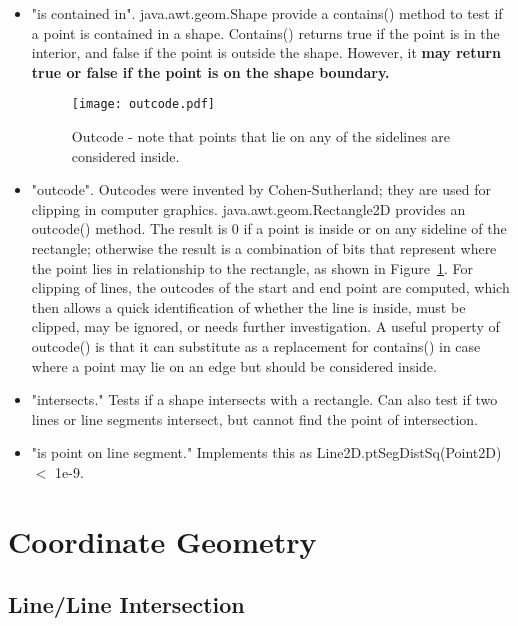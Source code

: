 \begin{itemize}
\item "is contained in".  java.awt.geom.Shape provide a contains() method to test if a point
    is contained in a shape.  Contains() returns true if the point is in the interior, and false
    if the point is outside the shape. However, it \textbf{may return true or false if the point is 
    on the shape boundary.} 

\begin{figure}
    \centering
    \texttt{[image: outcode.pdf]}
    \caption{Outcode - note that points that lie on any of the sidelines are considered inside.}
    \label{fig:outcode}
\end{figure}

\item "outcode". Outcodes were invented by Cohen-Sutherland; they are used for clipping
    in computer graphics.  java.awt.geom.Rectangle2D provides an outcode() method.
    The result is 0 if a point is inside or on any sideline of the rectangle; otherwise 
    the result is a
    combination of bits that represent where the point lies in relationship to the
    rectangle, as shown in Figure~\ref{fig:outcode}.
    For clipping of lines, the outcodes of the start and end point are
    computed, which then allows a quick identification of whether the line is inside,
    must be clipped, may be ignored, or needs further investigation.
    A useful property of outcode() is that it can substitute as a replacement for
    contains() in case where a point may lie on an edge but should be considered
    inside. 

\item "intersects."  Tests if a shape intersects with a rectangle.
    Can also test if two lines or line segments intersect, but cannot find the point of
    intersection.

\item "is point on line segment." Implements this as Line2D.ptSegDistSq(Point2D) $<$ 1e-9.

\end{itemize}

\section{Coordinate Geometry}

\subsection{Line/Line Intersection}
\label{sec:lineintersection}

